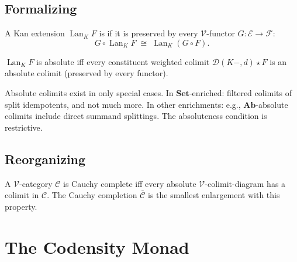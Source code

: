 \subsection{Formalizing}

\begin{definition}
\label{def:absolute-kan}
A Kan extension $\operatorname{Lan}_K F$ is  if it is
preserved by every $\mathcal{V}$-functor $G : \mathcal{E} \to \mathcal{F}$:
\begin{equation*}
  G \circ \operatorname{Lan}_K F \;\cong\; \operatorname{Lan}_K (G \circ F).
\end{equation*}
\end{definition}

\begin{theorem}
\label{thm:absolute-kan-char}
$\operatorname{Lan}_K F$ is absolute iff every constituent weighted colimit
$\mathcal{D}(K-, d) \star F$ is an absolute colimit (preserved by every
functor).
\end{theorem}

\begin{remark}
Absolute colimits exist in only special cases. In $\mathbf{Set}$-enriched:
filtered colimits of split idempotents, and not much more. In other
enrichments: e.g., $\mathbf{Ab}$-absolute colimits include direct summand
splittings. The absoluteness condition is restrictive.
\end{remark}

\subsection{Reorganizing}

\begin{proposition}
\label{prop:cauchy-via-absolute}
A $\mathcal{V}$-category $\mathcal{C}$ is Cauchy complete iff every absolute
$\mathcal{V}$-colimit-diagram has a colimit in $\mathcal{C}$. The Cauchy
completion $\bar{\mathcal{C}}$ is the smallest enlargement with this
property.
\end{proposition}


\section{The Codensity Monad}
\label{sec:codensity}

